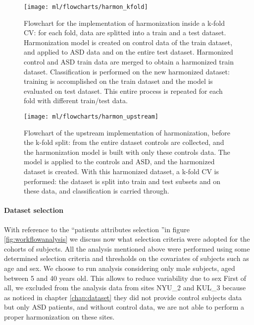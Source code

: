\documentclass[11pt]{report}
\begin{document}
\begin{figure}[h!]
\centering
\texttt{[image: ml/flowcharts/harmon\_kfold]}
\caption{Flowchart for the implementation of harmonization inside a k-fold CV: for each fold, data are splitted into a train and a test dataset. Harmonization model is created on control data of the train dataset, and applied to ASD data and on the entire test dataset. Harmonized control and ASD train data are merged to obtain a harmonized train dataset. Classification is performed on the new harmonized dataset: training is accomplished on the train dataset and the model is evaluated on test dataset. This entire process is repeated for each fold with different train/test data.}
\label{fig:harmon_kfold_flowchart}
\end{figure}



\begin{figure}[h!]
\centering
\texttt{[image: ml/flowcharts/harmon\_upstream]}
\caption{Flowchart of the upstream implementation of harmonization, before the k-fold split: from the entire dataset controls are collected, and the harmonization model is built with only these controls data. The model is applied to the controls and ASD, and the harmonized dataset is created. With this harmonized dataset, a k-fold CV is performed: the dataset is split into train and test subsets and on these data, and classification is carried through.}
\label{fig:harmon_upstream_flowchart}
\end{figure}


\paragraph{Dataset selection} \hfill

With reference to the \textquotedblleft patients attributes selection \textquotedblright in figure \ref{fig:workflowanalysis} we discuss now what selection criteria were adopted for the cohorts of subjects.
All the analysis mentioned above were performed using some determined selection criteria and thresholds on the covariates of subjects such as age and sex.
We choose to run analysis considering only male subjects, aged between 5 and 40 years old.
This allows to reduce variability due to sex
First of all, we excluded from the analysis data from sites NYU\_2 and KUL\_3 because as noticed in chapter \ref{chap:dataset} they did not provide control subjects data but only ASD patients, and without control data, we are not able to perform a proper harmonization on these sites.
\end{document}
